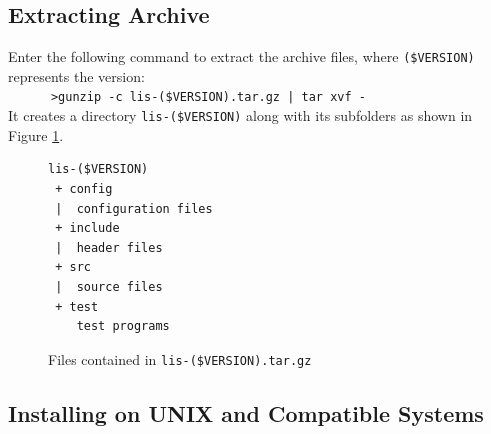 \documentclass[a4paper]{article}
\begin{document}
 \subsection{Extracting Archive}
Enter the following command to extract the archive files, 
where \verb|($VERSION)| represents the version:\\
 \verb&      >gunzip -c lis-($VERSION).tar.gz | tar xvf - &\\
It creates a directory {\tt lis-(\$VERSION)} along 
with its subfolders as shown in Figure \ref{listargz}.

\begin{figure}[htbp]
\begin{center}
\small
\begin{verbatim}
lis-($VERSION)
 + config
 |  configuration files
 + include
 |  header files
 + src
 |  source files
 + test
    test programs
\end{verbatim}
\end{center}
\caption{Files contained in {\tt lis-(\$VERSION).tar.gz}}
\label{listargz}
\end{figure}
\newpage
\subsection{Installing on UNIX and Compatible Systems}
\end{document}
